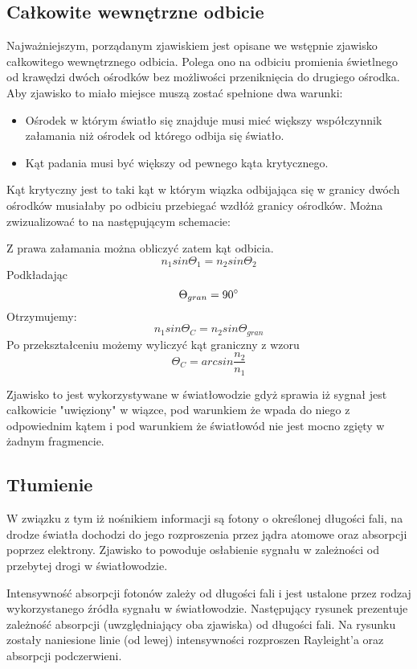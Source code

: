 \documentclass[paper=a4, fontsize=11pt]{scrartcl} %
\numberwithin{equation}{section} %
\numberwithin{figure}{section} %
\numberwithin{table}{section} %
\begin{document}
\subsection{Całkowite wewnętrzne odbicie}

Najważniejszym, porządanym zjawiskiem jest opisane we wstępnie zjawisko całkowitego wewnętrznego odbicia. Polega ono na odbiciu promienia świetlnego od
krawędzi dwóch ośrodków bez możliwości przeniknięcia do drugiego ośrodka. Aby zjawisko to miało miejsce muszą zostać spełnione dwa warunki:
\begin{itemize}
  \item Ośrodek w którym światło się znajduje musi mieć większy współczynnik załamania niż ośrodek od którego odbija się światło.
  \item Kąt padania musi być większy od pewnego kąta krytycznego.
\end{itemize}

Kąt krytyczny jest to taki kąt w którym wiązka odbijająca się w granicy dwóch ośrodków musiałaby po odbiciu przebiegać wzdłóż granicy ośrodków.
Można zwizualizować to na następującym schemacie:

Z prawa załamania można obliczyć zatem kąt odbicia.\[n_1sin\Theta_1=n_2sin\Theta_2\] 
Podkładając \[\Theta_{gran}=90\degree\] 
Otrzymujemy: \[n_1sin\Theta_C=n_2sin\Theta_{gran}\]
Po przekształceniu możemy wyliczyć kąt graniczny z wzoru \[\Theta_C=arcsin\frac{n_2}{n_1}\]

Zjawisko to jest wykorzystywane w światłowodzie gdyż sprawia iż sygnał jest całkowicie "uwięziony" w wiązce, pod warunkiem że wpada do niego
z odpowiednim kątem i pod warunkiem że światłowód nie jest mocno zgięty w żadnym fragmencie.

\subsection{Tłumienie}

W związku z tym iż nośnikiem informacji są fotony o określonej długości fali, na drodze światła dochodzi do jego rozproszenia przez jądra atomowe oraz absorpcji poprzez
elektrony. Zjawisko to powoduje osłabienie sygnału w zależności od przebytej drogi w światłowodzie. 

Intensywność absorpcji fotonów zależy od długości fali i jest ustalone przez rodzaj wykorzystanego źródła sygnału w światłowodzie. Następujący rysunek prezentuje
zależność absorpcji (uwzględniający oba zjawiska) od długości fali. Na rysunku zostały naniesione linie (od lewej) intensywności rozproszen Rayleight'a oraz absorpcji podczerwieni.
\end{document}
